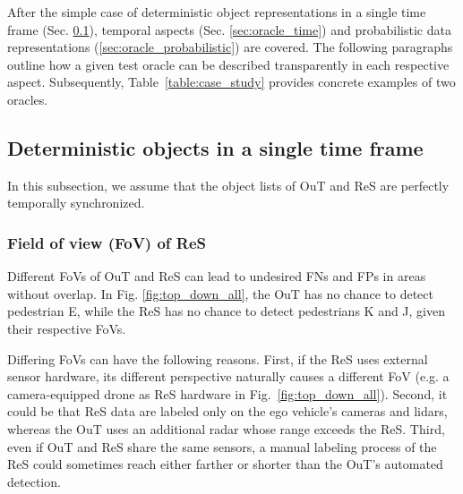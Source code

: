 \documentclass[conference]{IEEEtran}
\begin{document}
After the simple case of deterministic object representations in a single time frame (Sec. \ref{sec:oracle_simple}), temporal aspects (Sec. \ref{sec:oracle_time}) and probabilistic data representations (\ref{sec:oracle_probabilistic}) are covered.
The following paragraphs outline how a given test oracle can be described transparently in each respective aspect.
Subsequently, Table~\ref{table:case_study} provides concrete examples of two oracles. %



\subsection{Deterministic objects in a single time frame}
\label{sec:oracle_simple}

In this subsection, we assume that the object lists of OuT and ReS are perfectly temporally synchronized. 

\subsubsection{Field of view (FoV) of ReS}
\label{sec:basic_fov_ref}
Different FoVs of OuT and ReS can lead to undesired FNs and FPs in areas without overlap.
In Fig. \ref{fig:top_down_all}, the OuT has no chance to detect pedestrian E, while the ReS has no chance to detect pedestrians K and J, given their respective FoVs. 

Differing FoVs can have the following reasons. %
First, if the ReS uses external sensor hardware, its different perspective naturally causes a different FoV (e.g. a camera-equipped drone as ReS hardware in  Fig.~\ref{fig:top_down_all}). 
Second, it could be that ReS data are labeled only on the ego vehicle's cameras and lidars, whereas the OuT uses an additional radar whose range exceeds the ReS. 
Third, even if OuT and ReS share the same sensors, a manual labeling process of the ReS could sometimes reach either farther or shorter than the OuT's automated detection.
\end{document}
